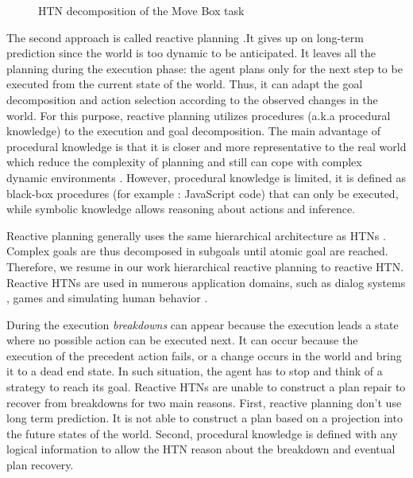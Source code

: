 \documentclass[conference]{IEEEtran}
\begin{document}
	\begin{figure}[t]
		\centering
		\caption{HTN decomposition of the Move Box task}
		\label{Fig:repair}
	\end{figure}
	\par The second approach is called  reactive planning \cite{firby1987investigation}.It gives up on long-term prediction since the world is too dynamic to be anticipated. It leaves all the planning during the execution phase: the agent plans only for the next step to be executed from the current  state of the world. Thus, it can adapt the goal decomposition and action selection according to the observed changes in the world. For this purpose, reactive planning utilizes procedures (a.k.a procedural knowledge) to the execution and goal decomposition. The main advantage of procedural knowledge is that it is closer and more representative to the real world which reduce the complexity of planning and still can cope with complex dynamic environments \cite {brom2005hierarchical}. However, procedural knowledge is limited, it is defined as black-box procedures (for example : JavaScript code) that  can only be executed, while symbolic knowledge allows reasoning about actions and inference. 
	\par Reactive planning generally uses the same hierarchical architecture as HTNs \cite{erol1994htn}. Complex goals are thus decomposed in subgoals until atomic goal are reached. Therefore, we resume in our work hierarchical reactive planning to reactive HTN.
	Reactive HTNs are used in numerous application domains, such as dialog systems \cite{bohus2003ravenclaw}, games \cite{isla2005handling} and simulating human behavior \cite{brom2005hierarchical}. 
	\par During the execution \emph{breakdowns} can  appear because the execution leads a state where no possible action can be executed next. It can occur because the execution of the precedent action fails, or a change occurs in the world and bring it to a dead end state.  In such situation, the agent has to stop and think of a strategy to reach its goal. Reactive HTNs are unable to construct a plan repair to recover from breakdowns for two main reasons. First, reactive planning don't use long term prediction. It is not able to construct a plan based on a projection into the future states of the world. Second, procedural knowledge is defined with any logical information to allow the HTN reason about the breakdown and  eventual plan recovery.
	
\end{document}
